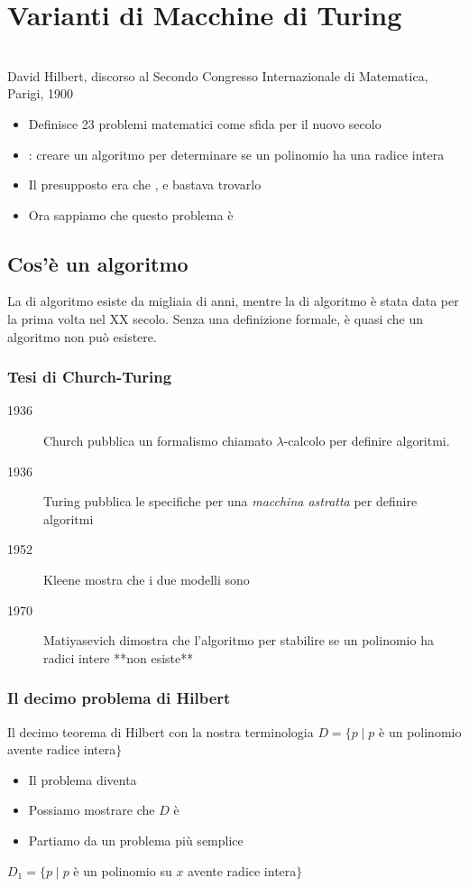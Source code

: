 \section{Varianti di Macchine di Turing}
\\
David Hilbert, discorso al Secondo Congresso Internazionale di Matematica, Parigi, 1900
\begin{itemize}
	\item Definisce 23 problemi matematici come sfida per il nuovo secolo 
	\item {}: creare un algoritmo per determinare se un polinomio ha una radice intera
	\item Il presupposto era che , e bastava trovarlo
	\item Ora sappiamo che questo problema è  
\end{itemize}

\subsection{Cos'è un algoritmo}
La  di algoritmo esiste da migliaia di anni, mentre la 
di algoritmo è stata data per la prima volta nel XX secolo. 
Senza una definizione formale, è quasi  che un algoritmo non può esistere. 

\subsubsection{Tesi di Church-Turing}
\begin{description}
	\item[1936] Church pubblica un formalismo chiamato
		$\lambda$-calcolo per definire algoritmi. 
	\item[1936] Turing pubblica le specifiche per una 
		\textit{macchina astratta} per definire algoritmi
	\item[1952] Kleene mostra che i due modelli sono 
	\item[1970] Matiyasevich dimostra che l'algoritmo per 
		stabilire se un polinomio ha radici intere **non esiste**
\end{description}

\subsubsection{Il decimo problema di Hilbert }
Il decimo teorema di Hilbert con la nostra terminologia 
$D=\{p\mid p$ è un polinomio avente radice intera$\}$ 
\begin{itemize}
	\item Il problema diventa 
	\item Possiamo mostrare che $D$ è  
	\item Partiamo da un problema più semplice 
\end{itemize}
$D_1=\{p\mid p$ è un polinomio su $x$ avente radice intera$\}$ 

